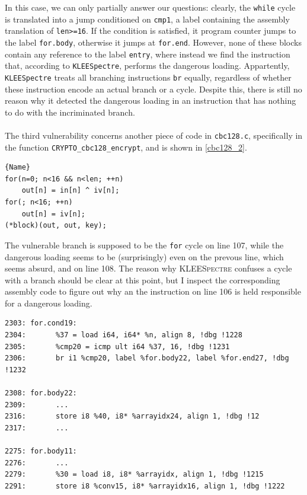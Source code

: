 \documentclass[12pt,a4paper]{book}
\theoremstyle{definition}
\begin{document}
	In this case, we can only partially answer our questions: clearly, the \texttt{while} cycle is translated into a jump conditioned on \texttt{cmp1}, a label containing the assembly translation of \texttt{len>=16}. If the condition is satisfied, it program counter jumps to the label \texttt{for.body}, otherwise it jumps at \texttt{for.end}. However, none of these blocks contain any reference to the label \texttt{entry}, where instead we find the instruction that, according to \texttt{KLEESpectre}, performs the dangerous loading. Appartently, \texttt{KLEESpectre} treats all branching instructions \texttt{br} equally, regardless of whether these instruction encode an actual branch or a cycle. Despite this, there is still no reason why it detected the dangerous loading in an instruction that has nothing to do with the incriminated branch. 
	\paragraph{}The third vulnerability concerns another piece of code in \texttt{cbc128.c}, specifically in the function \texttt{CRYPTO\_cbc128\_encrypt}, and is shown in \ref{cbc128_2}.
	
	\begin{minipage}{.45\textwidth}
		\begin{lstlisting}[caption=\texttt{cbc128.c}, firstnumber=105, label=cbc128_2]{Name}
for(n=0; n<16 && n<len; ++n)
	out[n] = in[n] ^ iv[n];
for(; n<16; ++n)
	out[n] = iv[n];
(*block)(out, out, key);
		\end{lstlisting}
	\end{minipage}
	\vspace{3mm}
	
	The vulnerable branch is supposed to be the \texttt{for} cycle on line 107, while the dangerous loading seems to be (surprisingly) even on the prevous line, which seems absurd, and on line 108. The reason why \textsc{KLEESpectre} confuses a cycle with a branch should be clear at this point, but I inspect the corresponding assembly code to figure out why an the instruction on line 106 is held responsible for a dangerous loading.
	
	\lstset{
		numbers=none
	}
	\begin{lstlisting}[caption=\texttt{assembly.ll}]
2303: for.cond19:                
2304: 		%37 = load i64, i64* %n, align 8, !dbg !1228
2305:		%cmp20 = icmp ult i64 %37, 16, !dbg !1231                       
2306: 		br i1 %cmp20, label %for.body22, label %for.end27, !dbg !1232

2308: for.body22: 
2309:		...
2316:		store i8 %40, i8* %arrayidx24, align 1, !dbg !12
2317:		...

2275: for.body11: 
2276:		...
2279: 		%30 = load i8, i8* %arrayidx, align 1, !dbg !1215
2291: 		store i8 %conv15, i8* %arrayidx16, align 1, !dbg !1222
	\end{lstlisting}
	\vspace{3mm}
	
\end{document}
